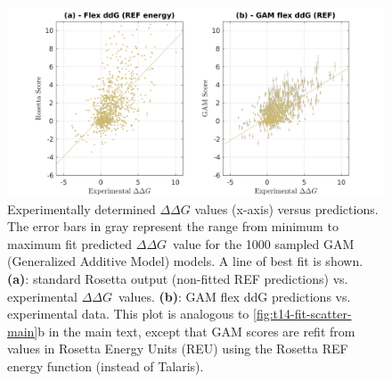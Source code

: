 \documentclass[journal=jpcbfk,manuscript=suppinfo]{achemso}
\newcommand\ddg{$\Delta\Delta G$}
\begin{document}
\begin{figure}
  \includegraphics[width=\textwidth,keepaspectratio]{figures/zemu-sigmoid2-corrs-supp.png}
  \caption[]{
    Experimentally determined $\Delta\Delta G$ values (x-axis) versus predictions.
    The error bars in gray represent the range from minimum to maximum fit predicted \ddg\ value for the 1000 sampled GAM (Generalized Additive Model) models.
    A line of best fit is shown.
    \textbf{(a)}: standard Rosetta output (non-fitted REF predictions) vs. experimental \ddg\ values.
    \textbf{(b)}: GAM flex ddG predictions vs. experimental data.
    This plot is analogous to \cref{fig:t14-fit-scatter-main}b in the main text, except that GAM scores are refit from values in Rosetta Energy Units (REU) using the Rosetta REF\cite{alford_rosetta_2017} energy function (instead of Talaris\cite{song_structure-guided_2011,shapovalov_smoothed_2011,omeara_combined_2015}).
  } \label{fig:t14-fit-scatter-supp}
\end{figure}
\end{document}
